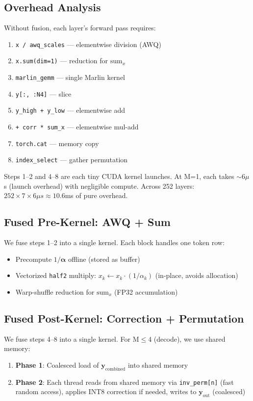 \documentclass[11pt,a4paper]{article}
\begin{document}
\subsection{Overhead Analysis}

Without fusion, each layer's forward pass requires:
\begin{enumerate}
    \item \texttt{x / awq\_scales} --- elementwise division (AWQ)
    \item \texttt{x.sum(dim=1)} --- reduction for $\text{sum}_x$
    \item \texttt{marlin\_gemm} --- single Marlin kernel
    \item \texttt{y[:, :N4]} --- slice
    \item \texttt{y\_high + y\_low} --- elementwise add
    \item \texttt{+ corr * sum\_x} --- elementwise mul-add
    \item \texttt{torch.cat} --- memory copy
    \item \texttt{index\_select} --- gather permutation
\end{enumerate}

Steps 1--2 and 4--8 are each tiny CUDA kernel launches. At M=1, each takes $\sim$6$\mu$s (launch overhead) with negligible compute. Across 252 layers: $252 \times 7 \times 6\mu s \approx 10.6$ms of pure overhead.

\subsection{Fused Pre-Kernel: AWQ + Sum}

We fuse steps 1--2 into a single kernel. Each block handles one token row:
\begin{itemize}
    \item Precompute $1/\boldsymbol{\alpha}$ offline (stored as buffer)
    \item Vectorized \texttt{half2} multiply: $x_k \leftarrow x_k \cdot (1/\alpha_k)$ (in-place, avoids allocation)
    \item Warp-shuffle reduction for $\text{sum}_x$ (FP32 accumulation)
\end{itemize}

\subsection{Fused Post-Kernel: Correction + Permutation}

We fuse steps 4--8 into a single kernel. For M$\leq$4 (decode), we use shared memory:
\begin{enumerate}
    \item \textbf{Phase 1}: Coalesced load of $\mathbf{y}_{\text{combined}}$ into shared memory
    \item \textbf{Phase 2}: Each thread reads from shared memory via \texttt{inv\_perm[n]} (fast random access), applies INT8 correction if needed, writes to $\mathbf{y}_{\text{out}}$ (coalesced)
\end{enumerate}
\end{document}

